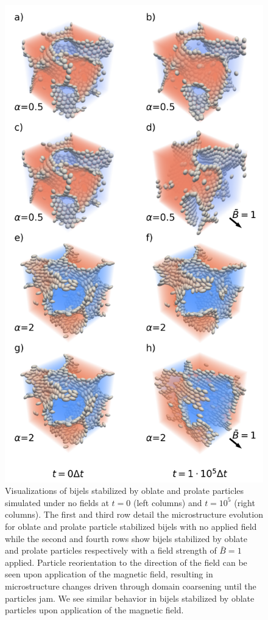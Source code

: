 \begin{figure} 
\centering 
\includegraphics[scale=0.4]{../figures/results/paper2/microstructure_viz-field_on.png} 
\caption{Visualizations of bijels stabilized by oblate and prolate particles simulated under no fields at $t = 0$ (left columns) and $t = 10^5$ (right columns). The first 
         and third row detail the microstructure evolution for oblate and prolate particle stabilized bijels with no applied field while the second and fourth rows show 
         bijels stabilized by oblate and prolate particles respectively with a field strength of $\bar{B} = 1$ applied. Particle reorientation to the direction of the 
         field can be seen upon application of the magnetic field, resulting in microstructure changes driven through domain coarsening until the particles jam. We see 
         similar behavior in bijels stabilized by oblate particles upon application of the magnetic field.}
\label{fig:microstructure_viz-field_on} 
\end{figure}

